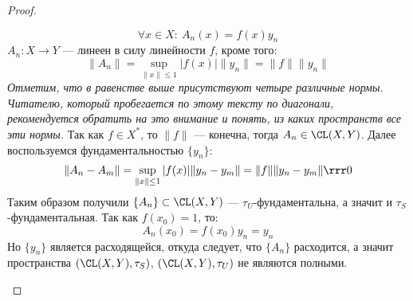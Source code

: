 \begin{proof}
\begin{enumerate}
		$$
		 \forall x \in X: \ A_n(x) = f(x)y_n
		$$
		$A_n: X \to Y$ --- линеен в силу линейности $f$, кроме того:
		$$
		\|A_n\| = \sup\limits_{\|x\| \leq 1}|f(x)| \|y_n\| = \|f\| \|y_n\|
		$$
		\textit{Отметим, что в равенстве выше присутствуют четыре различные нормы. Читателю, который пробегается по этому тексту по диагонали, рекомендуется обратить на это внимание и понять, из каких пространств все эти нормы.} Так как $f \in X^*$, то $\|f\|$ --- конечна, тогда $A_n \in \CL(X, Y)$. Далее воспользуемся фундаментальностью $\{y_n\}$:
		$$
		\|A_n - A_m\| = \sup\limits_{\|x\| \leq 1}|f(x)| \|y_n - y_m\| = \|f\| \|y_n - y_m\| \rrr 0
		$$
		Таким образом получили $\{A_n\} \subset \CL(X, Y)$ --- $\tau_U$-фундаментальна, а значит и $\tau_S$-фундаментальная. Так как $f(x_0) = 1$, то:
		$$
		A_n(x_0) = f(x_0) y_n = y_n
		$$ 
		Но $\{y_n\}$ является расходящейся, откуда следует, что $\{A_n\}$ расходится, а значит пространства $(\CL(X,Y), \tau_S)$, $(\CL(X,Y), \tau_U)$ не являются полными.
	\end{enumerate}
\end{proof}